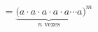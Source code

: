 \documentclass[preview]{standalone}
\begin{document}
\begin{align*}
=\underbrace{(a \cdot a \cdot a \cdot a \cdot a \cdots a}_{n \text{ vezes}})^m
\end{align*}
\end{document}
